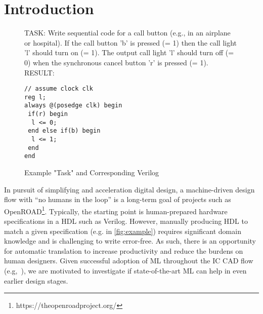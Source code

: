 \section{Introduction}
\label{sec:intro}

\begin{figure}[b]
\begin{tcolorbox}[fontlower=\footnotesize, fontupper=\footnotesize,top=3pt,bottom=2pt,left=3pt,right=3pt,]
{TASK: Write sequential code for a call button (e.g., in an airplane or hospital). If the call button 'b' is pressed (= 1) then the call light 'l' should turn on (= 1).
The output call light 'l' should turn off (= 0) when the synchronous cancel button 'r' is pressed (= 1). }\\ \vspace{-4mm}
\tcblower  \vspace{-2mm}
{RESULT:}
\begin{lstlisting}
// assume clock clk
reg l;
always @(posedge clk) begin
 if(r) begin
  l <= 0;
 end else if(b) begin 
  l <= 1;
 end
end
\end{lstlisting}
\vspace{-7mm}
\end{tcolorbox}
\vspace{-4mm}
\caption{Example "Task" and Corresponding Verilog\label{fig:example}}
\vspace{-10mm}
\end{figure}

In pursuit of simplifying and acceleration digital design, a machine-driven design flow with ``no humans in the loop'' is a long-term goal of projects such as OpenROAD\footnote{https://theopenroadproject.org/}.
Typically, the starting point is human-prepared hardware specifications in a \ac{HDL} such as Verilog.
However, manually producing \ac{HDL} to match a given specification (e.g. in \autoref{fig:example}) requires significant domain knowledge and is challenging to write error-free. 
As such, there is an opportunity for automatic translation to increase productivity and reduce the burdens on human designers. 
Given successful adoption of \ac{ML} throughout the \ac{IC} \ac{CAD} flow (e.g,~\cite{servadei_accurate_2019,yu_developing_2018,kahng_machine_2018}), we are motivated to investigate if state-of-the-art \ac{ML} can help in even earlier design stages. 

